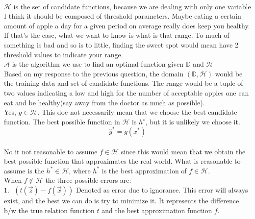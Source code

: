 \documentclass[12pt]{article}
\begin{document}
\begin{enumerate}
\\$\mathcal{H}$ is the set of candidate functions, because we are dealing with only one variable I think it should be composed of threshold parameters. Maybe eating a certain amount of apple a day for a given period on average really does keep you healthy. If that's the case, what we want to know is what is that range. To much of something is bad and so is to little, finding the sweet spot would mean have 2 threshold values to indicate your range.
\\$\mathcal{A}$ is the algorithm we use to find an optimal function given $\mathbb{D}$ and $\mathcal{H}$
\\Based on my response to the previous question, the domain  $(\mathbb{D}, \mathcal{H})$ would be the training data and set of candidate functions. The range would be a tuple of two values indicating a low and high for  the number of acceptable apples one can eat and be healthy(say away from the doctor as much as possible).
\\ Yes,  $g \in \mathcal{H}$. This doe not necessarily mean that we choose the best candidate function. The best possible function in $\mathcal{H}$ is   $h^{\star}$, but it is unlikely we choose it.
$$\hat{y}^* = g(x^*)$$
\\No it not reasonable to assume $f \in \mathcal{H}$ since this would mean that we obtain the best possible function that approximates the real world. What is reasonable to assume is the $h^* \in \mathcal{H}$, where $h^*$ is the best approximation of  $f \in \mathcal{H}$.
\\When $f \notin \mathcal{H}$ the three possible errors are:
\\$ 1.\text{ } (t(\vec{z}) - f(\vec{x}))$ Denoted as error due to ignorance. This error will always exist, and the best we can do is try to minimize it. It represents the difference b/w the true relation function $t$ and the best approximation function $f$.

\end{enumerate}
\end{document}
